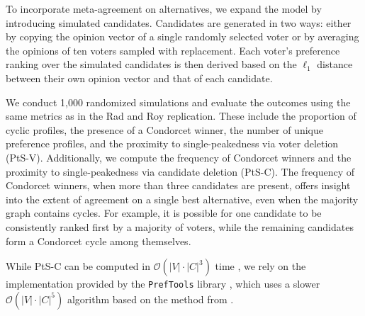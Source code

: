 To incorporate meta-agreement on alternatives, we expand the model by
introducing simulated candidates. Candidates are generated in two ways: either
by copying the opinion vector of a single randomly selected voter or by
averaging the opinions of ten voters sampled with replacement. Each voter's
preference ranking over the simulated candidates is then derived based on the
$\ell_1$ distance between their own opinion vector and that of each candidate.

We conduct 1,000 randomized simulations and evaluate the outcomes using the
same metrics as in the Rad and Roy replication. These include the proportion of
cyclic profiles, the presence of a Condorcet winner, the number of unique
preference profiles, and the proximity to single-peakedness via voter deletion
(PtS-V). Additionally, we compute the frequency of Condorcet winners and the
proximity to single-peakedness via candidate deletion (PtS-C). The frequency of
Condorcet winners, when more than three candidates are present, offers insight
into the extent of agreement on a single best alternative, even when the
majority graph contains cycles. For example, it is possible for one candidate
to be consistently ranked first by a majority of voters, while the remaining
candidates form a Condorcet cycle among themselves.

While PtS-C can be computed in $\mathcal{O}(|V| \cdot |C|^3)$ time
\cite{przedmojskiAlgorithmsExperimentsNearly}, we rely on the implementation
provided by the \texttt{PrefTools} library \cite{PrefLibPreflibtools2025},
which uses a slower $\mathcal{O}(|V| \cdot |C|^5)$ algorithm based on the
method from \citet{erdelyiComputationalAspectsNearly2013}.
